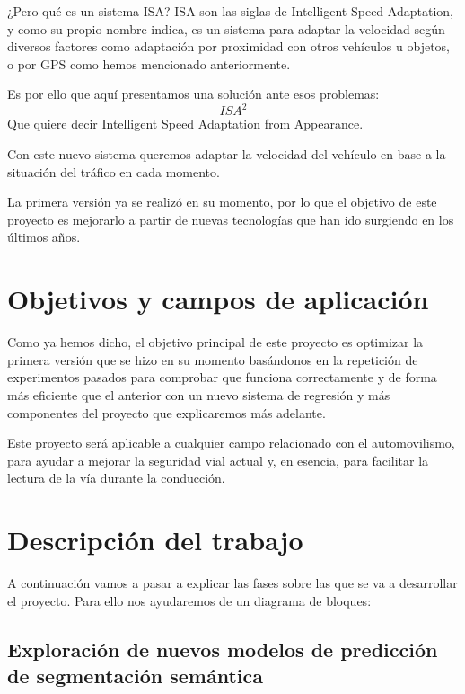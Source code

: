 \documentclass[12pt,oneside,a4paper]{article}
\begin{document}
¿Pero qué es un sistema ISA? ISA son las siglas de Intelligent Speed Adaptation, y como su propio nombre indica, es un sistema para adaptar la velocidad según diversos factores como adaptación por proximidad con otros vehículos u objetos, o por GPS como hemos mencionado anteriormente.

Es por ello que aquí presentamos una solución ante esos problemas: \[ISA^{2}\]
Que quiere decir Intelligent Speed Adaptation from Appearance.

Con este nuevo sistema queremos adaptar la velocidad del vehículo en base a la situación del tráfico en cada momento.

La primera versión ya se realizó en su momento, por lo que el objetivo de este proyecto es mejorarlo a partir de nuevas tecnologías que han ido surgiendo en los últimos años.

\section{Objetivos y campos de aplicación}

Como ya hemos dicho, el objetivo principal de este proyecto es optimizar la primera versión que se hizo en su momento basándonos en la repetición de experimentos pasados para comprobar que funciona correctamente y de forma más eficiente que el anterior con un nuevo sistema de regresión y más componentes del proyecto que explicaremos más adelante.

Este proyecto será aplicable a cualquier campo relacionado con el automovilismo, para ayudar a mejorar la seguridad vial actual y, en esencia, para facilitar la lectura de la vía durante la conducción.

\section{Descripción del trabajo}

A continuación vamos a pasar a explicar las fases sobre las que se va a desarrollar el proyecto. Para ello nos ayudaremos de un diagrama de bloques:

\begin{center}
\end{center}
\subsection{Exploración de nuevos modelos de predicción de segmentación semántica}
\end{document}
